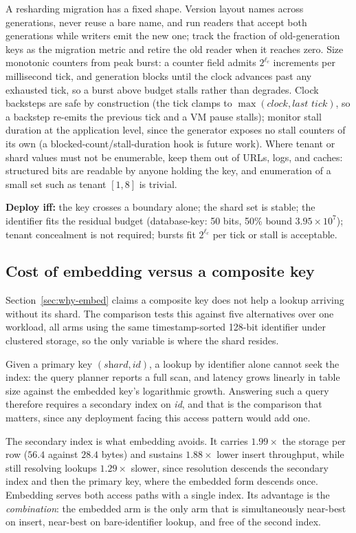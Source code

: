 \documentclass{svproc}
\begin{document}
A resharding migration has a fixed shape. Version layout names across generations, never reuse a bare name, and run readers that accept both generations while writers emit the new one; track the fraction of old-generation keys as the migration metric and retire the old reader when it reaches zero. Size monotonic counters from peak
burst: a counter field admits $2^{\ell_c}$ increments per millisecond tick, and
generation blocks until the clock advances past any exhausted tick, so a burst
above budget stalls rather than degrades. Clock backsteps are safe by
construction (the tick clamps to $\max(\textit{clock}, \textit{last tick})$, so a
backstep re-emits the previous tick and a VM pause stalls); monitor stall
duration at the application level, since the generator exposes no stall counters
of its own (a blocked-count/stall-duration hook is future work). Where tenant or shard values must not be enumerable, keep them out
of URLs, logs, and caches: structured bits are readable by anyone holding the
key, and enumeration of a small set such as tenant $[1,8]$ is trivial.

\noindent\textbf{Deploy iff:} the key crosses a boundary alone; the shard set is stable; the identifier fits the residual budget (database-key: 50 bits, 50\% bound $3.95\times10^7$); tenant concealment is not required; bursts fit $2^{\ell_c}$ per tick or stall is acceptable.

\subsection{Cost of embedding versus a composite key}
\label{sec:composite-bench}

Section~\ref{sec:why-embed} claims a composite key does not help a lookup
arriving without its shard. The comparison tests this against five alternatives over
one workload, all arms using the same timestamp-sorted 128-bit identifier
under clustered storage, so the only variable is
where the shard resides.

Given a primary key $(\textit{shard},\textit{id})$, a lookup by
identifier alone cannot seek the index: the query planner
reports a full scan, and latency grows linearly in table size against
the embedded key's logarithmic growth. Answering such a query therefore
requires a secondary index on \textit{id}, and that is the comparison
that matters, since any deployment facing this access pattern would add
one.

The secondary index is what embedding avoids. It carries $1.99\times$ the
storage per row ($56.4$ against $28.4$ bytes) and sustains $1.88\times$
lower insert throughput, while still resolving lookups $1.29\times$
slower, since resolution descends the secondary index and then the primary
key, where the embedded form descends once. Embedding serves both access
paths with a single index. Its advantage is the \emph{combination}: the
embedded arm is the only arm that is simultaneously near-best on insert,
near-best on bare-identifier lookup, and free of the second index.
\end{document}
